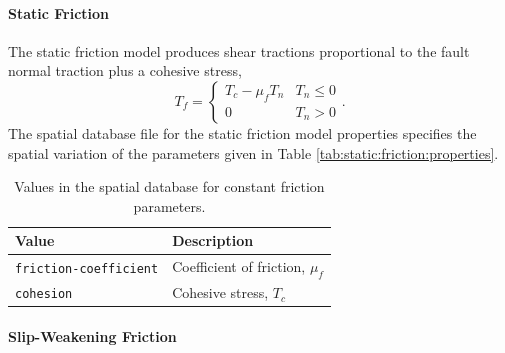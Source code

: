 \paragraph{Static Friction}

The static friction model produces shear tractions proportional to
the fault normal traction plus a cohesive stress,
\begin{equation}
T_{f}=\begin{cases}
T_{c}-\mu_{f}T_{n} & T_{n}\leq0\\
0 & T_{n}>0
\end{cases}.
\end{equation}
The spatial database file for the static friction model properties
specifies the spatial variation of the parameters given in Table \vref{tab:static:friction:properties}.

\begin{table}[htbp]
\caption{Values in the spatial database for constant friction parameters.}
\label{tab:static:friction:properties}
\begin{tabular}{lp{2.5in}}
\textbf{Value} & \textbf{Description}\\
\hline 
\texttt{friction-coefficient} & Coefficient of friction, $\mu_{f}$\\
\texttt{cohesion} & Cohesive stress, $T_{c}$\\
\hline 
\end{tabular}
\end{table}


\paragraph{Slip-Weakening Friction}
\label{sec:friction:slip:weakening}

